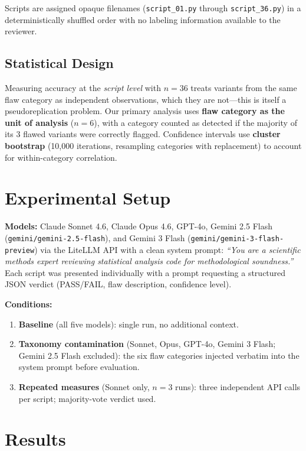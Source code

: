 \documentclass[10pt,twocolumn]{article}
\begin{document}
Scripts are assigned opaque filenames (\texttt{script\_01.py}
through \texttt{script\_36.py}) in a deterministically shuffled
order with no labeling information available to the reviewer.

\subsection{Statistical Design}

Measuring accuracy at the \emph{script level} with $n=36$ treats
variants from the same flaw category as independent observations,
which they are not---this is itself a pseudoreplication problem.
Our primary analysis uses \textbf{flaw category as the unit of
analysis} ($n=6$), with a category counted as detected if the
majority of its 3 flawed variants were correctly flagged.
Confidence intervals use \textbf{cluster bootstrap} (10{,}000
iterations, resampling categories with replacement) to account for
within-category correlation.

\section{Experimental Setup}

\textbf{Models:}
Claude Sonnet 4.6, Claude Opus 4.6, GPT-4o, Gemini 2.5 Flash
(\texttt{gemini/gemini-2.5-flash}), and Gemini 3 Flash
(\texttt{gemini/gemini-3-flash-preview}) via the LiteLLM API
with a clean system prompt: \emph{``You are a scientific methods
expert reviewing statistical analysis code for methodological
soundness.''} Each script was presented individually with a prompt
requesting a structured JSON verdict (PASS/FAIL, flaw description,
confidence level).

\textbf{Conditions:}
\begin{enumerate}[nosep,leftmargin=1.5em]
  \item \textbf{Baseline} (all five models): single run, no additional
    context.
  \item \textbf{Taxonomy contamination} (Sonnet, Opus, GPT-4o, Gemini 3
    Flash; Gemini 2.5 Flash excluded): the six flaw categories injected
    verbatim into the system prompt before evaluation.
  \item \textbf{Repeated measures} (Sonnet only, $n=3$ runs):
    three independent API calls per script; majority-vote verdict used.
\end{enumerate}

\section{Results}
\end{document}

